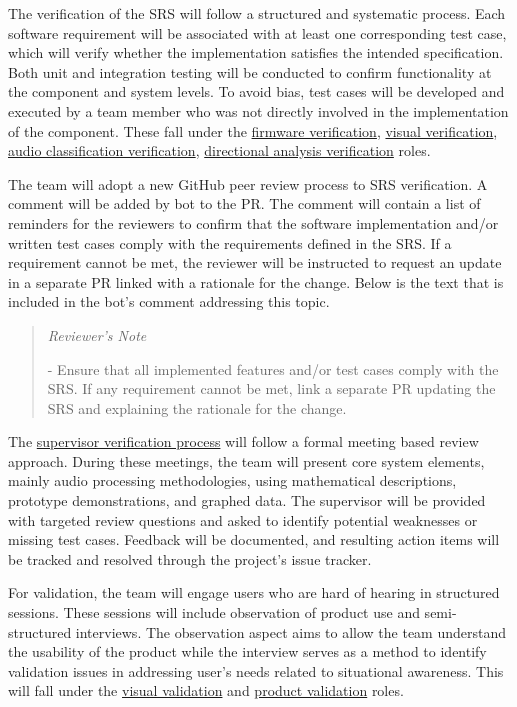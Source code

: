 \documentclass[12pt, titlepage]{article}
\newenvironment{shadedquotation}
    {\begin{quote}\itshape} {\end{quote}}
\begin{document}
The verification of the SRS will follow a structured and systematic process.
Each software requirement will be associated with at least one corresponding
test case, which will verify whether the implementation satisfies the intended
specification. Both unit and integration testing will be conducted to confirm
functionality at the component and system levels. To avoid bias, test cases will
be developed and executed by a team member who was not directly involved in the
implementation of the component. These fall under the
\hyperref[role:firmware_verfication]{firmware verification},
\hyperref[role:visual_vnv]{visual verification},
\hyperref[role:classification_verfication]{audio classification verification},
\hyperref[role:directional_verfication]{directional analysis verification}
roles. \newline

The team will adopt a new GitHub peer review process to SRS verification. A
comment will be added by bot to the PR. The comment will contain a list of
reminders for the reviewers to confirm that the software implementation and/or
written test cases comply with the requirements defined in the SRS. If a
requirement cannot be met, the reviewer will be instructed to request an update
in a separate PR linked with a rationale for the change. Below is the text that
is included in the bot's comment addressing this topic. \newline

\begin{shadedquotation}
Reviewer's Note

- Ensure that all implemented features and/or test cases comply with the SRS. If
any requirement cannot be met, link a separate PR updating the SRS and
explaining the rationale for the change.
\end{shadedquotation}

The 
\hyperref[role:audio_processing_verification]{supervisor verification process}
will follow a formal meeting based review approach. During these meetings, the
team will present core system elements, mainly audio processing methodologies,
using mathematical descriptions, prototype demonstrations, and graphed data. The
supervisor will be provided with targeted review questions and asked to identify
potential weaknesses or missing test cases. Feedback will be documented, and
resulting action items will be tracked and resolved through the project's issue
tracker. \newline


For validation, the team will engage users who are hard of hearing in structured
sessions. These sessions will include observation of product use and
semi-structured interviews. The observation aspect aims to allow the team
understand the usability of the product while the interview serves as a method
to identify validation issues in addressing user's needs related to situational
awareness. This will fall under the \hyperref[role:visual_vnv]{visual
validation} and \hyperref[role:product_validation]{product validation} roles.
\end{document}
